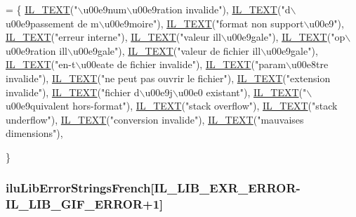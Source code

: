 \begin{DoxyCode}
= \{
    \hyperlink{il_8h_a2907c2129d2ba2ebbae6aa6a69b7f685}{IL\_TEXT}(\textcolor{stringliteral}{"\(\backslash\)u00e9num\(\backslash\)u00e9ration invalide"}),
  \hyperlink{il_8h_a2907c2129d2ba2ebbae6aa6a69b7f685}{IL\_TEXT}(\textcolor{stringliteral}{"d\(\backslash\)u00e9passement de m\(\backslash\)u00e9moire"}),
    \hyperlink{il_8h_a2907c2129d2ba2ebbae6aa6a69b7f685}{IL\_TEXT}(\textcolor{stringliteral}{"format non support\(\backslash\)u00e9"}),
    \hyperlink{il_8h_a2907c2129d2ba2ebbae6aa6a69b7f685}{IL\_TEXT}(\textcolor{stringliteral}{"erreur interne"}),
    \hyperlink{il_8h_a2907c2129d2ba2ebbae6aa6a69b7f685}{IL\_TEXT}(\textcolor{stringliteral}{"valeur ill\(\backslash\)u00e9gale"}),
  \hyperlink{il_8h_a2907c2129d2ba2ebbae6aa6a69b7f685}{IL\_TEXT}(\textcolor{stringliteral}{"op\(\backslash\)u00e9ration ill\(\backslash\)u00e9gale"}),
    \hyperlink{il_8h_a2907c2129d2ba2ebbae6aa6a69b7f685}{IL\_TEXT}(\textcolor{stringliteral}{"valeur de fichier ill\(\backslash\)u00e9gale"}),
    \hyperlink{il_8h_a2907c2129d2ba2ebbae6aa6a69b7f685}{IL\_TEXT}(\textcolor{stringliteral}{"en-t\(\backslash\)u00eate de fichier invalide"}),
    \hyperlink{il_8h_a2907c2129d2ba2ebbae6aa6a69b7f685}{IL\_TEXT}(\textcolor{stringliteral}{"param\(\backslash\)u00e8tre invalide"}),
    \hyperlink{il_8h_a2907c2129d2ba2ebbae6aa6a69b7f685}{IL\_TEXT}(\textcolor{stringliteral}{"ne peut pas ouvrir le fichier"}),
    \hyperlink{il_8h_a2907c2129d2ba2ebbae6aa6a69b7f685}{IL\_TEXT}(\textcolor{stringliteral}{"extension invalide"}),
    \hyperlink{il_8h_a2907c2129d2ba2ebbae6aa6a69b7f685}{IL\_TEXT}(\textcolor{stringliteral}{"fichier d\(\backslash\)u00e9j\(\backslash\)u00e0 existant"}),
    \hyperlink{il_8h_a2907c2129d2ba2ebbae6aa6a69b7f685}{IL\_TEXT}(\textcolor{stringliteral}{"\(\backslash\)u00e9quivalent hors-format"}),
    \hyperlink{il_8h_a2907c2129d2ba2ebbae6aa6a69b7f685}{IL\_TEXT}(\textcolor{stringliteral}{"stack overflow"}),   
  \hyperlink{il_8h_a2907c2129d2ba2ebbae6aa6a69b7f685}{IL\_TEXT}(\textcolor{stringliteral}{"stack underflow"}),
    \hyperlink{il_8h_a2907c2129d2ba2ebbae6aa6a69b7f685}{IL\_TEXT}(\textcolor{stringliteral}{"conversion invalide"}),
    \hyperlink{il_8h_a2907c2129d2ba2ebbae6aa6a69b7f685}{IL\_TEXT}(\textcolor{stringliteral}{"mauvaises dimensions"}),

\}
\end{DoxyCode}
\hypertarget{ilu__err-french_8h_ae7416d6115ade23414a0e710043f6a4e}{
\subsubsection[{ilu\-Lib\-Error\-Strings\-French}]{ ilu\-Lib\-Error\-Strings\-French\mbox{[}{\bf I\-L\-\_\-\-L\-I\-B\-\_\-\-E\-X\-R\-\_\-\-E\-R\-R\-O\-R}-\/{\bf I\-L\-\_\-\-L\-I\-B\-\_\-\-G\-I\-F\-\_\-\-E\-R\-R\-O\-R}+1\mbox{]}}}\label{ilu__err-french_8h_ae7416d6115ade23414a0e710043f6a4e}
